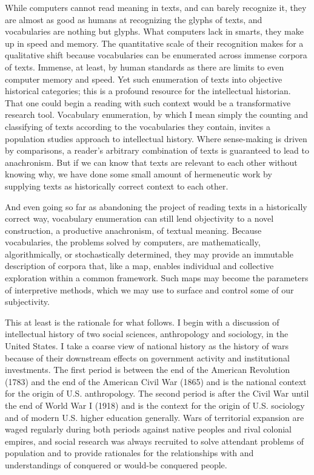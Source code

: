 \documentclass[]{book}
\theoremstyle{definition}
\theoremstyle{definition}
\theoremstyle{definition}
\theoremstyle{remark}
\begin{document}
While computers cannot read meaning in texts, and can barely recognize
it, they are almost as good as humans at recognizing the glyphs of
texts, and vocabularies are nothing but glyphs. What computers lack in
smarts, they make up in speed and memory. The quantitative scale of
their recognition makes for a qualitative shift because vocabularies can
be enumerated across immense corpora of texts. Immense, at least, by
human standards as there are limits to even computer memory and speed.
Yet such enumeration of texts into objective historical categories; this
is a profound resource for the intellectual historian. That one could
begin a reading with such context would be a transformative research
tool. Vocabulary enumeration, by which I mean simply the counting and
classifying of texts according to the vocabularies they contain, invites
a population studies approach to intellectual history. Where
sense-making is driven by comparisons, a reader's arbitrary combination
of texts is guaranteed to lead to anachronism. But if we can know that
texts are relevant to each other without knowing why, we have done some
small amount of hermeneutic work by supplying texts as historically
correct context to each other.

And even going so far as abandoning the project of reading texts in a
historically correct way, vocabulary enumeration can still lend
objectivity to a novel construction, a productive anachronism, of
textual meaning. Because vocabularies, the problems solved by computers,
are mathematically, algorithmically, or stochastically determined, they
may provide an immutable description of corpora that, like a map,
enables individual and collective exploration within a common framework.
Such maps may become the parameters of interpretive methods, which we
may use to surface and control some of our subjectivity.

This at least is the rationale for what follows. I begin with a
discussion of intellectual history of two social sciences, anthropology
and sociology, in the United States. I take a coarse view of national
history as the history of wars because of their downstream effects on
government activity and institutional investments. The first period is
between the end of the American Revolution (1783) and the end of the
American Civil War (1865) and is the national context for the origin of
U.S. anthropology. The second period is after the Civil War until the
end of World War I (1918) and is the context for the origin of U.S.
sociology and of modern U.S. higher education generally. Wars of
territorial expansion are waged regularly during both periods against
native peoples and rival colonial empires, and social research was
always recruited to solve attendant problems of population and to
provide rationales for the relationships with and understandings of
conquered or would-be conquered people.
\end{document}
